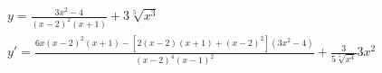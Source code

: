 \begin{ex}
\begin{align}
&y=\frac{3x^2-4}{(x-2)^2(x+1)}+3\sqrt[5]{x^3}\nonumber\\
&y'=\frac{6x(x-2)^2(x+1)-[2(x-2)(x+1)+(x-2)^2](3x^2-4)}{(x-2)^4(x-1)^2}+\frac{3}{5\sqrt[5]{x^4}}3x^2\nonumber
\end{align}
\end{ex}